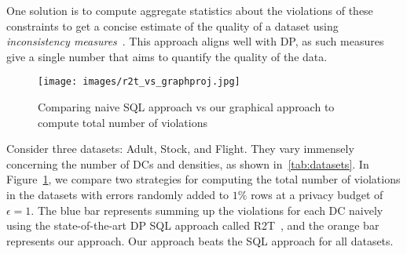 {One solution is to compute aggregate statistics about the violations of these constraints to get a concise estimate of the quality of a dataset using {\em inconsistency measures}~\cite{thimm2017compliance, parisi2019inconsistency, LivshitsKTIKR21}. 
This approach aligns well with DP, as such measures give a single number that aims to quantify the quality of the data. 



\begin{example}
    \begin{figure}
        \centering
        \texttt{[image: images/r2t\_vs\_graphproj.jpg]}
        \caption{Comparing naive SQL approach vs our graphical approach to compute total number of violations }
        \label{fig:r2tvsgraph}
    \end{figure}
     
    Consider three datasets: Adult, Stock, and Flight. They vary immensely concerning the number of DCs and densities, as shown in~\cref{tab:datasets}. In Figure~\ref{fig:r2tvsgraph}, we compare two strategies for computing the total number of violations in the datasets with errors randomly added to $1\%$ rows at a privacy budget of $\epsilon=1$. The blue bar represents summing up the violations for each DC naively using the state-of-the-art DP SQL approach called R2T~\cite{dong2022r2t}, and the orange bar represents our approach. Our approach beats the SQL approach for all datasets. 
\end{example}


}
